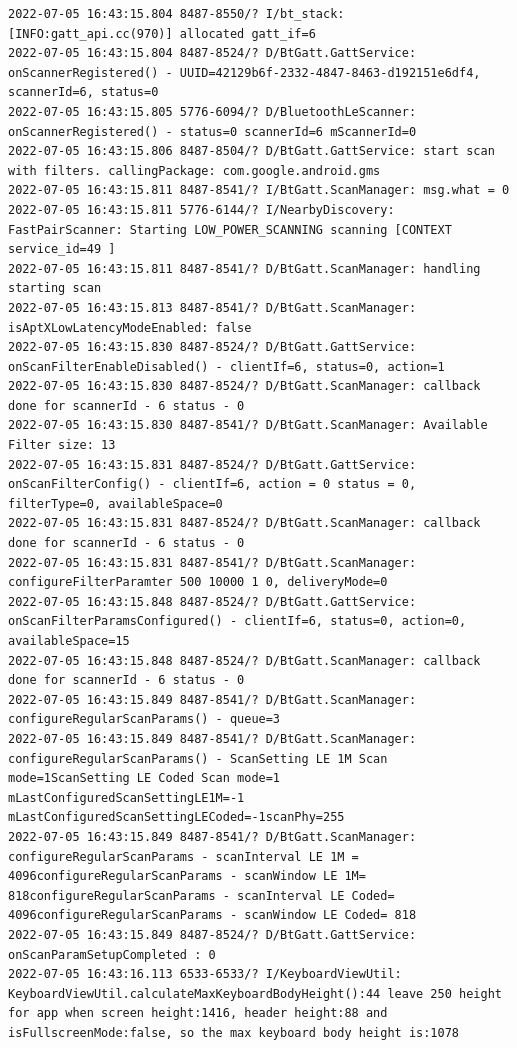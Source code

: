 \documentclass[a4paper,12pt]{book}
\begin{document}
\begin{lstlisting}
2022-07-05 16:43:15.804 8487-8550/? I/bt_stack: [INFO:gatt_api.cc(970)] allocated gatt_if=6
2022-07-05 16:43:15.804 8487-8524/? D/BtGatt.GattService: onScannerRegistered() - UUID=42129b6f-2332-4847-8463-d192151e6df4, scannerId=6, status=0
2022-07-05 16:43:15.805 5776-6094/? D/BluetoothLeScanner: onScannerRegistered() - status=0 scannerId=6 mScannerId=0
2022-07-05 16:43:15.806 8487-8504/? D/BtGatt.GattService: start scan with filters. callingPackage: com.google.android.gms
2022-07-05 16:43:15.811 8487-8541/? I/BtGatt.ScanManager: msg.what = 0
2022-07-05 16:43:15.811 5776-6144/? I/NearbyDiscovery: FastPairScanner: Starting LOW_POWER_SCANNING scanning [CONTEXT service_id=49 ]
2022-07-05 16:43:15.811 8487-8541/? D/BtGatt.ScanManager: handling starting scan
2022-07-05 16:43:15.813 8487-8541/? D/BtGatt.ScanManager: isAptXLowLatencyModeEnabled: false
2022-07-05 16:43:15.830 8487-8524/? D/BtGatt.GattService: onScanFilterEnableDisabled() - clientIf=6, status=0, action=1
2022-07-05 16:43:15.830 8487-8524/? D/BtGatt.ScanManager: callback done for scannerId - 6 status - 0
2022-07-05 16:43:15.830 8487-8541/? D/BtGatt.ScanManager: Available Filter size: 13
2022-07-05 16:43:15.831 8487-8524/? D/BtGatt.GattService: onScanFilterConfig() - clientIf=6, action = 0 status = 0, filterType=0, availableSpace=0
2022-07-05 16:43:15.831 8487-8524/? D/BtGatt.ScanManager: callback done for scannerId - 6 status - 0
2022-07-05 16:43:15.831 8487-8541/? D/BtGatt.ScanManager: configureFilterParamter 500 10000 1 0, deliveryMode=0
2022-07-05 16:43:15.848 8487-8524/? D/BtGatt.GattService: onScanFilterParamsConfigured() - clientIf=6, status=0, action=0, availableSpace=15
2022-07-05 16:43:15.848 8487-8524/? D/BtGatt.ScanManager: callback done for scannerId - 6 status - 0
2022-07-05 16:43:15.849 8487-8541/? D/BtGatt.ScanManager: configureRegularScanParams() - queue=3
2022-07-05 16:43:15.849 8487-8541/? D/BtGatt.ScanManager: configureRegularScanParams() - ScanSetting LE 1M Scan mode=1ScanSetting LE Coded Scan mode=1 mLastConfiguredScanSettingLE1M=-1 mLastConfiguredScanSettingLECoded=-1scanPhy=255
2022-07-05 16:43:15.849 8487-8541/? D/BtGatt.ScanManager: configureRegularScanParams - scanInterval LE 1M = 4096configureRegularScanParams - scanWindow LE 1M= 818configureRegularScanParams - scanInterval LE Coded= 4096configureRegularScanParams - scanWindow LE Coded= 818
2022-07-05 16:43:15.849 8487-8524/? D/BtGatt.GattService: onScanParamSetupCompleted : 0
2022-07-05 16:43:16.113 6533-6533/? I/KeyboardViewUtil: KeyboardViewUtil.calculateMaxKeyboardBodyHeight():44 leave 250 height for app when screen height:1416, header height:88 and isFullscreenMode:false, so the max keyboard body height is:1078

\end{lstlisting}
\end{document}
